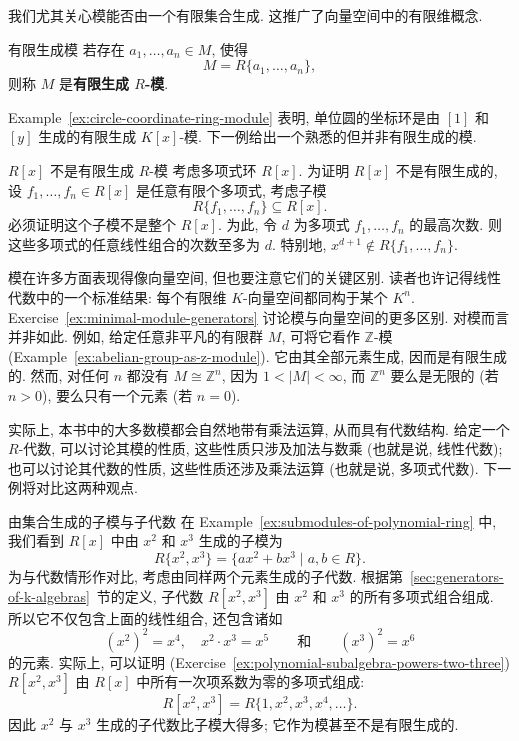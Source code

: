 我们尤其关心模能否由一个有限集合生成. 这推广了向量空间中的有限维概念.

\begin{Definition}{有限生成模}\leavevmode\label{def:finitely-generated-module}
  若存在 $a_{1},\ldots,a_{n}\in M$, 使得
  \[
    M=R\{a_{1},\ldots,a_{n}\},
  \]
  则称 $M$ 是\textbf{有限生成 $R$-模}.
\end{Definition}

Example~\ref{ex:circle-coordinate-ring-module} 表明, 单位圆的坐标环是由 $[1]$ 和 $[y]$ 生成的有限生成 $K[x]$-模. 下一例给出一个熟悉的但并非有限生成的模.

\begin{Example}{{\textmd{$R[x]$} 不是有限生成 $R$-模}}\leavevmode\label{ex:polynomial-ring-not-finite-module}
  考虑多项式环 $R[x]$. 为证明 $R[x]$ 不是有限生成的, 设 $f_{1},\ldots,f_{n}\in R[x]$ 是任意有限个多项式, 考虑子模
  \[
    R\{f_{1},\ldots,f_{n}\}\subseteq R[x].
  \]
  必须证明这个子模不是整个 $R[x]$. 为此, 令 $d$ 为多项式 $f_{1},\ldots,f_{n}$ 的最高次数. 则这些多项式的任意线性组合的次数至多为 $d$. 特别地, $x^{d+1}\notin R\{f_{1},\ldots,f_{n}\}$.
\end{Example}

\BookPairedNote
  {模在许多方面表现得像向量空间, 但也要注意它们的关键区别. 读者也许记得线性代数中的一个标准结果: 每个有限维 $K$-向量空间都同构于某个 $K^{n}$.}
  {Exercise~\ref{ex:minimal-module-generators} 讨论模与向量空间的更多区别.}
\noindent 对模而言并非如此. 例如, 给定任意非平凡的有限群 $M$, 可将它看作 $\mathbb{Z}$-模 (Example~\ref{ex:abelian-group-as-z-module}). 它由其全部元素生成, 因而是有限生成的. 然而, 对任何 $n$ 都没有 $M\cong\mathbb{Z}^{n}$, 因为 $1<|M|<\infty$, 而 $\mathbb{Z}^{n}$ 要么是无限的 (若 $n>0$), 要么只有一个元素 (若 $n=0$).

实际上, 本书中的大多数模都会自然地带有乘法运算, 从而具有代数结构. 给定一个 $R$-代数, 可以讨论其模的性质, 这些性质只涉及加法与数乘 (也就是说, 线性代数); 也可以讨论其代数的性质, 这些性质还涉及乘法运算 (也就是说, 多项式代数). 下一例将对比这两种观点.

\begin{Example}{由集合生成的子模与子代数}\leavevmode\label{ex:generated-submodule-versus-subalgebra}
  在 Example~\ref{ex:submodules-of-polynomial-ring} 中, 我们看到 $R[x]$ 中由 $x^{2}$ 和 $x^{3}$ 生成的子模为
  \[
    R\{x^{2},x^{3}\}=\{ax^{2}+bx^{3}\mid a,b\in R\}.
  \]
  为与代数情形作对比, 考虑由同样两个元素生成的子代数. 根据第~\ref{sec:generators-of-k-algebras}~节的定义, 子代数 $R[x^{2},x^{3}]$ 由 $x^{2}$ 和 $x^{3}$ 的所有多项式组合组成. 所以它不仅包含上面的线性组合, 还包含诸如
  \[
    (x^{2})^{2}=x^{4},\quad x^{2}\cdot x^{3}=x^{5}
    \qquad\text{和}\qquad (x^{3})^{2}=x^{6}
  \]
  的元素. 实际上, 可以证明 (Exercise~\ref{ex:polynomial-subalgebra-powers-two-three}) $R[x^{2},x^{3}]$ 由 $R[x]$ 中所有一次项系数为零的多项式组成:
  \[
    R[x^{2},x^{3}]=R\{1,x^{2},x^{3},x^{4},\ldots\}.
  \]
  因此 $x^{2}$ 与 $x^{3}$ 生成的子代数比子模大得多; 它作为模甚至不是有限生成的.
\end{Example}

